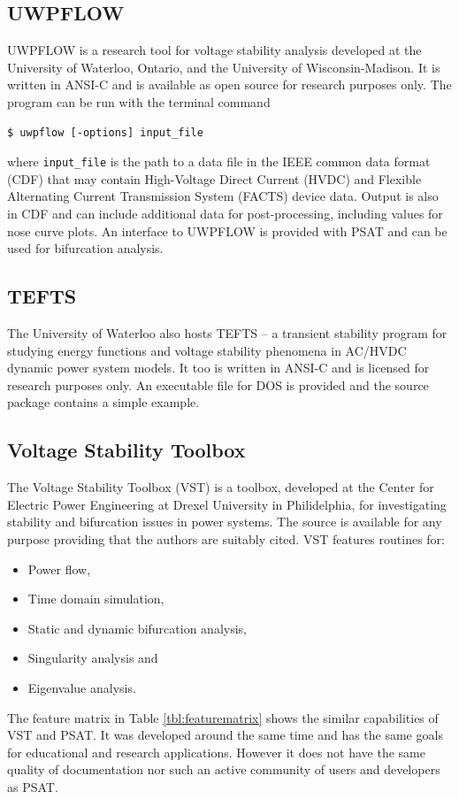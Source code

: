 \subsection*{UWPFLOW}
UWPFLOW is a research tool for voltage stability analysis developed at the
University of Waterloo, Ontario, and the University of Wisconsin-Madison.  It
is written in ANSI-C and is available as open source for research purposes
only. The program can be run with the terminal command
\begin{center}
\begin{verbatim}
$ uwpflow [-options] input_file
\end{verbatim}
\end{center}
where \texttt{input\_file} is the path to a data file in the IEEE common data
format (CDF) \cite{cdf:73} that may contain High-Voltage Direct Current (HVDC)
and Flexible Alternating Current Transmission System (FACTS) device data.
Output is also in CDF and can include additional data for post-processing,
including values for nose curve plots.  An interface to UWPFLOW is provided
with PSAT and can be used for bifurcation analysis.

\subsection*{TEFTS}
The University of Waterloo also hosts TEFTS -- a transient stability program
for studying energy functions and voltage stability phenomena in AC/HVDC
dynamic power system models.  It too is written in ANSI-C and is licensed for
research purposes only.  An executable file for DOS is provided and the source
package contains a simple example.

\subsection*{Voltage Stability Toolbox}
The Voltage Stability Toolbox (VST) is a \matlab toolbox, developed at the
Center for Electric Power Engineering at Drexel University in Philidelphia, for
investigating stability and bifurcation issues in power systems.  The source
is available for any purpose providing that the authors are suitably cited.
VST features routines for:
\begin{itemize}
  \item Power flow,
  \item Time domain simulation,
  \item Static and dynamic bifurcation analysis,
  \item Singularity analysis and
  \item Eigenvalue analysis.
\end{itemize}
The feature matrix in Table \ref{tbl:featurematrix} shows the similar
capabilities of VST and PSAT. It was developed around the same time and has
the same goals for educational and research applications.  However it does not
have the same quality of documentation nor such an active community of users
and developers as PSAT.

